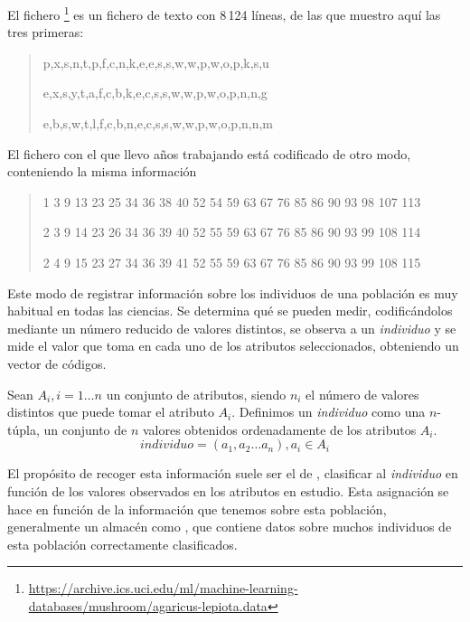 \noindent El fichero \mushroom\footnote{\url{https://archive.ics.uci.edu/ml/machine-learning-databases/mushroom/agaricus-lepiota.data}} es un fichero de texto con 8\,124 líneas, de las que muestro aquí las tres primeras:
\begin{quote}
   \footnotesize
   p,x,s,n,t,p,f,c,n,k,e,e,s,s,w,w,p,w,o,p,k,s,u
   
   e,x,s,y,t,a,f,c,b,k,e,c,s,s,w,w,p,w,o,p,n,n,g
   
   e,b,s,w,t,l,f,c,b,n,e,c,s,s,w,w,p,w,o,p,n,n,m
\end{quote}

\noindent El fichero \mushroom con el que llevo años trabajando está codificado de otro modo, conteniendo la misma información
\begin{quote}
   \footnotesize
   1 3 9 13 23 25 34 36 38 40 52 54 59 63 67 76 85 86 90 93 98 107 113
   
   2 3 9 14 23 26 34 36 39 40 52 55 59 63 67 76 85 86 90 93 99 108 114
   
   2 4 9 15 23 27 34 36 39 41 52 55 59 63 67 76 85 86 90 93 99 108 115
\end{quote}

Este modo de registrar información sobre los individuos de una población es muy habitual en todas las ciencias. Se determina qué \atributos se pueden medir, codificándolos mediante un número reducido de valores distintos, se observa a un \emph{individuo} y se mide el valor que toma en cada uno de los atributos seleccionados, obteniendo un vector de códigos.

\begin{Definition}[Individuo]
   Sean $A_i, i = 1 \ldots n$ un conjunto de atributos, siendo $n_i$ el número de valores distintos que puede tomar el atributo $A_i$. Definimos un \emph{individuo} como una $n$-túpla, un conjunto de $n$ valores obtenidos ordenadamente de los atributos $A_i$.
   $$individuo = \left(a_1, a_2\ldots a_n\right), a_i \in A_i$$
\label{def:individuo}
\end{Definition}

El propósito de recoger esta información suele ser el de \clasificacion, clasificar al \emph{individuo} en función de los valores observados en los atributos en estudio. Esta asignación se hace en función de la información que tenemos sobre esta población, generalmente un almacén \D como \mushroom, que contiene datos sobre muchos individuos de esta población correctamente clasificados.

